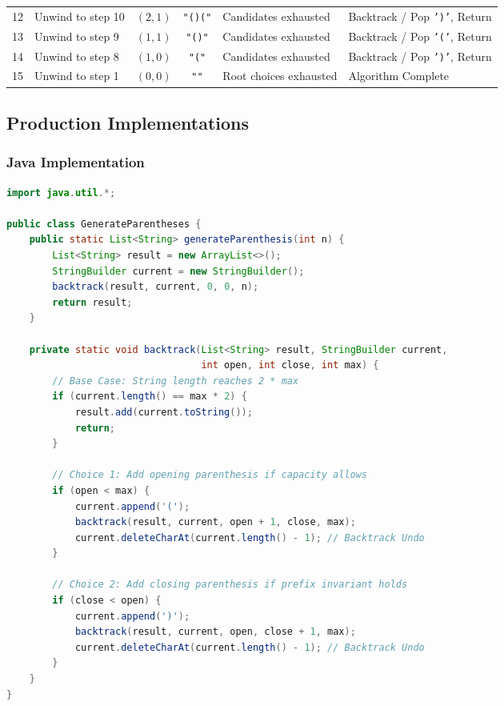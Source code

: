 \documentclass[10pt,journal,compsoc,onecolumn]{IEEEtran}
\begin{document}
\begin{table}[htbp]
\begin{tabular}{clccll}
12 & Unwind to step 10 & $(2, 1)$ & \texttt{"()("} & Candidates exhausted & Backtrack / Pop \texttt{')'}, Return \\
13 & Unwind to step 9 & $(1, 1)$ & \texttt{"()"} & Candidates exhausted & Backtrack / Pop \texttt{'('}, Return \\
14 & Unwind to step 8 & $(1, 0)$ & \texttt{"("} & Candidates exhausted & Backtrack / Pop \texttt{')'}, Return \\
15 & Unwind to step 1 & $(0, 0)$ & \texttt{""} & Root choices exhausted & Algorithm Complete \\
\bottomrule
\end{tabular}
\end{table}

\subsection{Production Implementations}

\subsubsection{Java Implementation}
\begin{lstlisting}[language=Java, caption={Production Java Implementation of Valid Parentheses Generation}]
import java.util.*;

public class GenerateParentheses {
    public static List<String> generateParenthesis(int n) {
        List<String> result = new ArrayList<>();
        StringBuilder current = new StringBuilder();
        backtrack(result, current, 0, 0, n);
        return result;
    }

    private static void backtrack(List<String> result, StringBuilder current, 
                                  int open, int close, int max) {
        // Base Case: String length reaches 2 * max
        if (current.length() == max * 2) {
            result.add(current.toString());
            return;
        }

        // Choice 1: Add opening parenthesis if capacity allows
        if (open < max) {
            current.append('(');
            backtrack(result, current, open + 1, close, max);
            current.deleteCharAt(current.length() - 1); // Backtrack Undo
        }

        // Choice 2: Add closing parenthesis if prefix invariant holds
        if (close < open) {
            current.append(')');
            backtrack(result, current, open, close + 1, max);
            current.deleteCharAt(current.length() - 1); // Backtrack Undo
        }
    }
}
\end{lstlisting}
\end{document}
